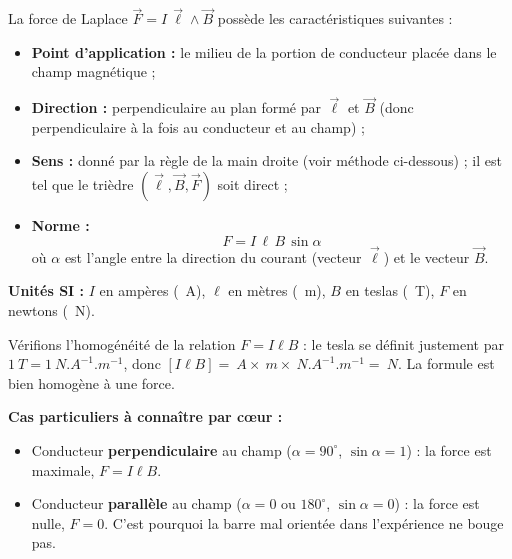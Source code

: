 \documentclass[11pt]{article}
\begin{document}
\begin{propriete}
La force de Laplace $\vec{F} = I\,\vec{\ell} \wedge \vec{B}$ possède les caractéristiques suivantes :
\begin{itemize}
\item \textbf{Point d'application :} le milieu de la portion de conducteur placée dans le champ magnétique ;
\item \textbf{Direction :} perpendiculaire au plan formé par $\vec{\ell}$ et $\vec{B}$ (donc perpendiculaire à la fois au conducteur et au champ) ;
\item \textbf{Sens :} donné par la règle de la main droite (voir méthode ci-dessous) ; il est tel que le trièdre $(\vec{\ell}, \vec{B}, \vec{F})$ soit direct ;
\item \textbf{Norme :} \[ F = I\,\ell\,B\,\sin\alpha \] où $\alpha$ est l'angle entre la direction du courant (vecteur $\vec{\ell}$) et le vecteur $\vec{B}$.
\end{itemize}
\textbf{Unités SI :} $I$ en ampères (\SI{}{A}), $\ell$ en mètres (\SI{}{m}), $B$ en teslas (\SI{}{T}), $F$ en newtons (\SI{}{N}).
\end{propriete}

Vérifions l'homogénéité de la relation $F = I\ell B$ : le tesla se définit justement par $\SI{1}{T} = \SI{1}{N.A^{-1}.m^{-1}}$, donc $[I\ell B] = \SI{}{A} \times \SI{}{m} \times \SI{}{N.A^{-1}.m^{-1}} = \SI{}{N}$. La formule est bien homogène à une force.

\textbf{Cas particuliers à connaître par cœur :}
\begin{itemize}
\item Conducteur \textbf{perpendiculaire} au champ ($\alpha = 90^\circ$, $\sin\alpha = 1$) : la force est maximale, $F = I\ell B$.
\item Conducteur \textbf{parallèle} au champ ($\alpha = 0$ ou $180^\circ$, $\sin\alpha = 0$) : la force est nulle, $F = 0$. C'est pourquoi la barre mal orientée dans l'expérience ne bouge pas.
\end{itemize}
\end{document}
